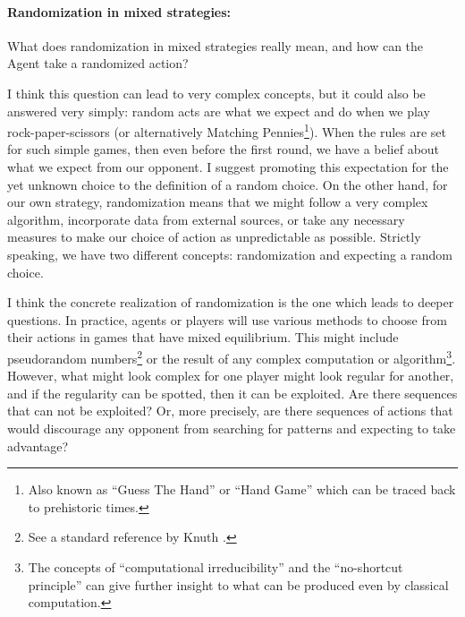 \documentclass{article}
\begin{document}
\paragraph{Randomization in mixed strategies:}
What does randomization in mixed strategies really mean, and how can the Agent take a randomized action?

I think this question can lead to very complex concepts, but it could also be answered very simply: random acts are what we expect and do when we play rock-paper-scissors (or alternatively Matching Pennies\footnote{Also known as ``Guess The Hand'' or ``Hand Game'' \cite{book:CulinIndianGames,book:PrehistoricGames} which can be traced back to prehistoric times.}).
When the rules are set for such simple games, then even before the first round, we have a belief about what we expect from our opponent. I suggest promoting this expectation for the yet unknown choice to the definition of a random choice.
On the other hand, for our own strategy, randomization means that we might follow a very complex algorithm, incorporate data from external sources, or take any necessary measures to make our choice of action as unpredictable as possible.
Strictly speaking, we have two different concepts: randomization and expecting a random choice.

I think the concrete realization of randomization is the one which leads to deeper questions.
In practice, agents or players will use various methods to choose from their actions in games that have mixed equilibrium. This might include pseudorandom numbers\footnote{See a standard reference by Knuth \cite{book:KnuthVol2}.} or the result of any complex computation or algorithm\footnote{The concepts of ``computational irreducibility'' \cite{paper:Wolfram1984,paper:Wolfram1985,book:NKS,book:IlachinskiCellularAutomata,book:SchiffCellularAutomata,paper:ComputationalIrreducibilityAndCorseGraining} and the ``no-shortcut principle'' \cite{paper:NoShortCut,paper:Lloyd2012FreeWill} can give further insight to what can be produced even by classical computation.}. However, what might look complex for one player might look regular for another, and if the regularity can be spotted, then it can be exploited.
Are there sequences that can not be exploited? Or, more precisely, are there sequences of actions that would discourage any opponent from searching for patterns and expecting to take advantage?
\end{document}

